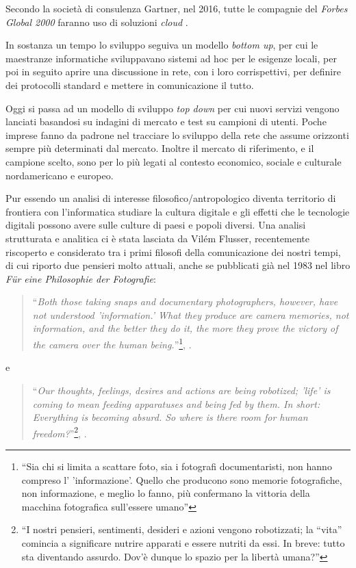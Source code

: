 Secondo la società di consulenza Gartner, nel 2016, tutte le compagnie
del \emph{Forbes Global 2000} faranno uso di soluzioni \emph{cloud}
\citep{EY2011}.

In sostanza un tempo lo sviluppo seguiva un modello \emph{bottom up}, per
cui le maestranze informatiche sviluppavano sistemi ad hoc per le
esigenze locali, per poi in seguito aprire una discussione in rete,
con i loro corrispettivi, per definire dei protocolli standard e
mettere in comunicazione il tutto.

Oggi si passa ad un modello di sviluppo \emph{top down} per cui nuovi
servizi vengono lanciati basandosi su indagini di mercato e test su
campioni di utenti. Poche imprese fanno da padrone nel tracciare lo
sviluppo della rete che assume orizzonti sempre più determinati dal
mercato. Inoltre il mercato di riferimento, e il campione scelto, sono
per lo più legati al contesto economico, sociale e culturale
nordamericano e europeo. 

Pur essendo un analisi di interesse filosofico/antropologico diventa
territorio di frontiera con l'informatica studiare la cultura digitale
e gli effetti che le tecnologie digitali possono avere sulle culture
di paesi e popoli diversi. Una analisi strutturata e analitica ci è
stata lasciata da Vilém Flusser, recentemente riscoperto e considerato
tra i primi filosofi della comunicazione dei nostri tempi, di cui
riporto due pensieri molto attuali, anche se pubblicati già nel 1983
nel libro \emph{F{\"u}r eine Philosophie der Fotografie}:

\begin{quote}
  ``\emph{Both those taking snaps and documentary photographers, however,
  have not understood 'information.' What they produce are camera
  memories, not information, and the better they do it, the more they
  prove the victory of the camera over the human
  being.}''\footnote{``Sia chi si limita a scattare foto, sia i fotografi
documentaristi, non hanno compreso l' 'informazione'. Quello che
producono sono memorie fotografiche, non informazione, e meglio lo
fanno, più confermano la vittoria della macchina fotografica
sull'essere umano''}, \citet{flusser1983philosophie}.
\end{quote}

e 

\begin{quote}
  ``\emph{Our thoughts, feelings, desires and actions are being
    robotized; 'life' is coming to mean feeding apparatuses and being
    fed by them. In short: Everything is becoming absurd. So where is
    there room for human freedom?}''\footnote{``I nostri pensieri,
    sentimenti, desideri e azioni vengono robotizzati; la ``vita''
    comincia a significare nutrire apparati e essere nutriti da
    essi. In breve: tutto sta diventando assurdo. Dov'è dunque lo
    spazio per la libertà umana?''}, \citet{flusser1983philosophie}.
\end{quote}

